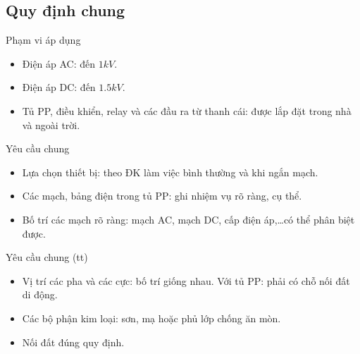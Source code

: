 \documentclass[20pt]{beamer}
\begin{document}
\subsection*{Quy định chung}
\begin{frame}{Phạm vi áp dụng}
	\begin{itemize}
	\justifying
		\item Điện áp AC: đến $1kV$.
		
		\item Điện áp DC: đến $1.5kV$.
		
		\item Tủ PP, điều khiển, relay và các đầu ra từ thanh cái: được lắp đặt trong nhà và ngoài trời.		
	\end{itemize}
\end{frame}

\begin{frame}{Yêu cầu chung}
	\begin{itemize}
	\justifying
		\item Lựa chọn thiết bị: theo ĐK làm việc bình thường và khi ngắn mạch.
		
		\item Các mạch, bảng điện trong tủ PP: ghi nhiệm vụ rõ ràng, cụ thể.
		
		\item Bố trí các mạch rõ ràng: mạch AC, mạch DC, cấp điện áp,\ldots có thể phân biệt được.	
		
	\end{itemize}
\end{frame}

\begin{frame}{Yêu cầu chung (tt)}
	\begin{itemize}
	\justifying
		\item Vị trí các pha và các cực: bố trí giống nhau. Với tủ PP: phải có chỗ nối đất di động.
		
		\item Các bộ phận kim loại: sơn, mạ hoặc phủ lớp chống ăn mòn.
		
		\item Nối đất đúng quy định.
		
	\end{itemize}
\end{frame}


\end{document}
